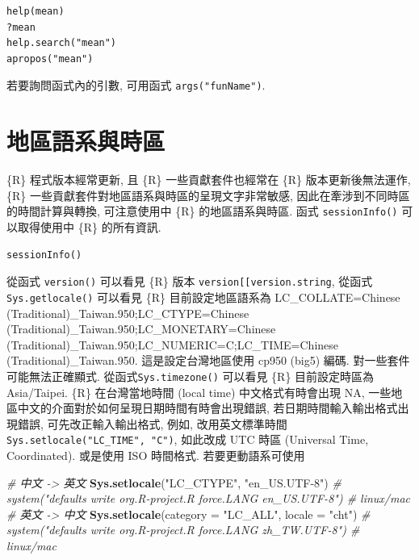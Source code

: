 \documentclass[
]{book}
\newenvironment{Shaded}{\begin{snugshade}}{\end{snugshade}}
\newcommand{\CommentTok}[1]{\textcolor[rgb]{0.56,0.35,0.01}{\textit{#1}}}
\newcommand{\DataTypeTok}[1]{\textcolor[rgb]{0.13,0.29,0.53}{#1}}
\newcommand{\KeywordTok}[1]{\textcolor[rgb]{0.13,0.29,0.53}{\textbf{#1}}}
\newcommand{\NormalTok}[1]{#1}
\newcommand{\StringTok}[1]{\textcolor[rgb]{0.31,0.60,0.02}{#1}}
\begin{document}
\begin{verbatim}
help(mean)              
?mean                 
help.search("mean")            
apropos("mean")                  
\end{verbatim}

若要詢問函式內的引數,
可用函式 \texttt{args("funName")}.

\hypertarget{ux5730ux5340ux8a9eux7cfbux8207ux6642ux5340}{%
\section{地區語系與時區}\label{ux5730ux5340ux8a9eux7cfbux8207ux6642ux5340}}

\{R\} 程式版本經常更新, 且 \{R\} 一些貢獻套件也經常在 \{R\} 版本更新後無法運作,
\{R\} 一些貢獻套件對地區語系與時區的呈現文字非常敏感,
因此在牽涉到不同時區的時間計算與轉換, 可注意使用中 \{R\} 的地區語系與時區.
函式 \texttt{sessionInfo()} 可以取得使用中 \{R\} 的所有資訊.

\begin{verbatim}
sessionInfo()
\end{verbatim}

從函式 \texttt{version()} 可以看見 \{R\} 版本
\texttt{version{[}{[}\textquotesingle{}version.string\textquotesingle{}{]}{]}},
從函式\texttt{Sys.getlocale()} 可以看見 \{R\} 目前設定地區語系為
LC\_COLLATE=Chinese (Traditional)\_Taiwan.950;LC\_CTYPE=Chinese (Traditional)\_Taiwan.950;LC\_MONETARY=Chinese (Traditional)\_Taiwan.950;LC\_NUMERIC=C;LC\_TIME=Chinese (Traditional)\_Taiwan.950. 這是設定台灣地區使用 cp950 (big5) 編碼.
對一些套件可能無法正確顯式.
從函式\texttt{Sys.timezone()} 可以看見 \{R\} 目前設定時區為
Asia/Taipei.
\{R\} 在台灣當地時間 (local time) 中文格式有時會出現 NA,
一些地區中文的介面對於如何呈現日期時間有時會出現錯誤,
若日期時間輸入輸出格式出現錯誤, 可先改正輸入輸出格式,
例如, 改用英文標準時間 \texttt{Sys.setlocale("LC\_TIME",\ "C")},
如此改成 UTC 時區 (Universal Time, Coordinated).
或是使用 ISO 時間格式.
若要更動語系可使用

\begin{Shaded}
\begin{Highlighting}[]
\CommentTok{\# 中文 {-}\textgreater{} 英文}
\KeywordTok{Sys.setlocale}\NormalTok{(}\StringTok{"LC\_CTYPE"}\NormalTok{, }\StringTok{"en\_US.UTF{-}8"}\NormalTok{)}
\CommentTok{\# system("defaults write org.R{-}project.R force.LANG en\_US.UTF{-}8") \# linux/mac}
\CommentTok{\# 英文 {-}\textgreater{} 中文}
\KeywordTok{Sys.setlocale}\NormalTok{(}\DataTypeTok{category =} \StringTok{"LC\_ALL"}\NormalTok{, }\DataTypeTok{locale =} \StringTok{"cht"}\NormalTok{)}
\CommentTok{\# system("defaults write org.R{-}project.R force.LANG zh\_TW.UTF{-}8") \# linux/mac}
\end{Highlighting}
\end{Shaded}
\end{document}
